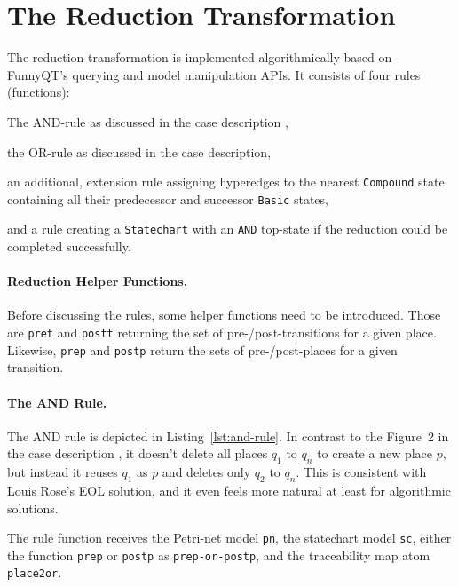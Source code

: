 \documentclass[submission]{eptcs}
\begin{document}
\section{The Reduction Transformation}
\label{sec:reduction-transformation}

The reduction transformation is implemented algorithmically based on FunnyQT's
querying and model manipulation APIs.  It consists of four rules (functions):
\begin{compactenum}
\item The AND-rule as discussed in the case description \cite{pn2sccasedesc},
\item the OR-rule as discussed in the case description,
\item an additional, extension rule assigning hyperedges to the nearest
  \verb|Compound| state containing all their predecessor and successor
  \verb|Basic| states,
\item and a rule creating a \verb|Statechart| with an \verb|AND| top-state if
  the reduction could be completed successfully.
\end{compactenum}


\paragraph{Reduction Helper Functions.}
\label{sec:reduct-help-functions}

Before discussing the rules, some helper functions need to be introduced.
Those are \verb|pret| and \verb|postt| returning the set of
pre-/post-transitions for a given place.  Likewise, \verb|prep| and
\verb|postp| return the sets of pre-/post-places for a given transition.

\paragraph{The AND Rule.}
\label{sec:and-rule}

The AND rule is depicted in Listing~\ref{lst:and-rule}.  In contrast to the
Figure~2 in the case description \cite{pn2sccasedesc}, it doesn't delete all
places $q_1$ to $q_n$ to create a new place $p$, but instead it reuses $q_1$ as
$p$ and deletes only $q_2$ to $q_n$.  This is consistent with Louis Rose's EOL
solution, and it even feels more natural at least for algorithmic solutions.

The rule function receives the Petri-net model \verb|pn|, the statechart model
\verb|sc|, either the function \verb|prep| or \verb|postp| as
\verb|prep-or-postp|, and the traceability map atom \verb|place2or|.
\end{document}
